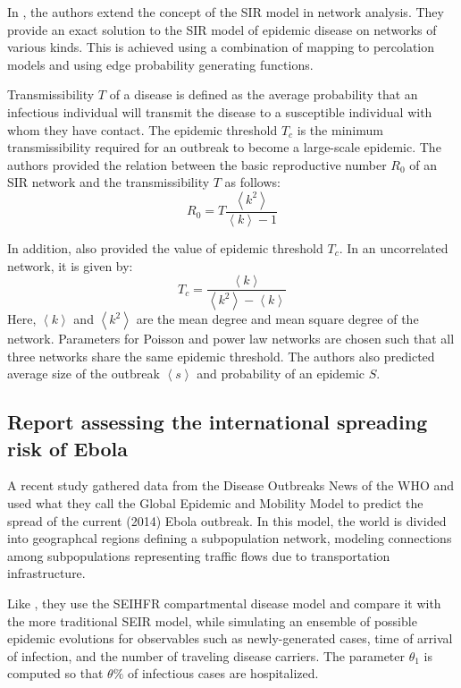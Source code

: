 \documentclass[10pt, journal,onecolumn]{IEEEtran}
\begin{document}
In \citep{newman2002spread}, the authors extend the concept of the SIR model in network analysis.
They provide an exact solution to the SIR model of epidemic disease on networks of various kinds.
This is achieved using a combination of mapping to percolation models and using edge probability generating functions.

Transmissibility $T$ of a disease is defined as the average probability that an infectious
individual will transmit the disease to a susceptible individual with whom they have contact.
The epidemic threshold $T_c$ is the minimum transmissibility required for an outbreak to become
a large-scale epidemic. The authors provided the relation between the basic reproductive number
$R_0$ of an SIR network and the transmissibility $T$ as follows:
\[
R_0 = T  \dfrac{\left\langle k^2 \right\rangle}{\left\langle k \right\rangle-1}
\]

In addition, \citep{newman2002spread} also provided the value of epidemic threshold $T_c$.  In an uncorrelated network, it is given by:
\[
T_c =\dfrac{\left\langle k \right\rangle}{\left\langle k^2 \right\rangle - \left\langle k \right\rangle}
\]
Here, $\left\langle k \right\rangle$ and $\left\langle k^2 \right\rangle$ are the mean degree and mean square degree of the network. Parameters for Poisson and power law networks are chosen such that all three networks share the same epidemic threshold. The authors also predicted average size of the outbreak $\left\langle s \right\rangle$ and probability of an epidemic $S$. 


\subsection{\textbf{Report assessing the international spreading risk of Ebola \citep{gomes2014assessing}}}

A recent study \citep{gomes2014assessing} gathered data from the Disease Outbreaks News of
the WHO and used what they call the Global Epidemic and Mobility Model to predict the spread of the
current (2014) Ebola outbreak. In this model, the world is divided into geographcal regions defining a
subpopulation network, modeling connections among subpopulations representing traffic flows due to
transportation infrastructure.

Like \citep{legrand2007understanding}, they use the SEIHFR compartmental disease model and compare
it with the more traditional SEIR model, while simulating
an ensemble of possible epidemic evolutions for observables such as newly-generated
cases, time of arrival of infection, and the number of traveling disease carriers.
The parameter $\theta_1$ is computed so that $\theta\%$ of infectious cases
are hospitalized.
\end{document}
